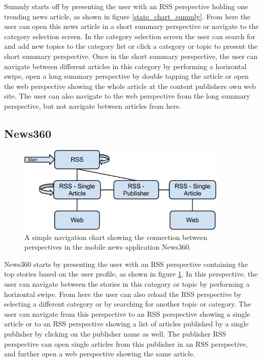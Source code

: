 Summly starts off by presenting the user with an RSS perspective holding one trending news article, as shown in figure \ref{state_chart_summly}. From here the user can open this news article in a short summary perspective or navigate to the category selection screen. In the category selection screen the user can search for and add new topics to the category list or click a category or topic to present the short summary perspective. Once in the short summary perspective, the user can navigate between different articles in this category by performing a horizontal swipe, open a long summary perspective by double tapping the article or open the web perspective showing the whole article at the content publishers own web site. The user can also navigate to the web perspective from the long summary perspective, but not navigate between articles from here.

\subsection{News360}

\begin{figure}[!htbp]
\centering
\includegraphics[width=100mm]{GFX/statecharts/News360.png}
\caption{A simple navigation chart showing the connection between perspectives in the mobile news application News360.}
\label{state_chart_news360}
\end{figure}

News360 starts by presenting the user with an RSS perspective containing the top stories based on the user profile, as shown in figure \ref{state_chart_news360}. In this perspective, the user can navigate between the stories in this category or topic by performing a horizontal swipe. From here the user can also reload the RSS perspective by selecting a different category or by searching for another topic or category. The user can navigate from this perspective to an RSS perspective showing a single article or to an RSS perspective showing a list of articles published by a single publisher by clicking on the publisher name as well. The publisher RSS perspective can open single articles from this publisher in an RSS perspective, and further open a web perspective showing the same article.

